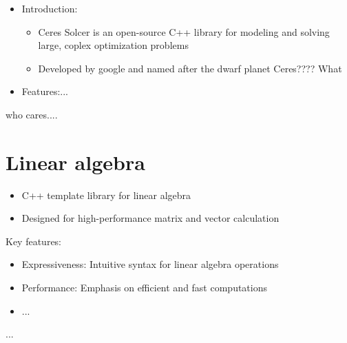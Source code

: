 \begin{itemize}
        \item Introduction:
            \begin{itemize}
                    \item Ceres Solcer is an open-source C++ library for modeling and solving large, coplex optimization problems
                    \item Developed by google and named after the dwarf planet Ceres???? What
                    
            \end{itemize}
        \item Features:...

\end{itemize}
who cares....



\section{Linear algebra}

\dfn{}
{
    \begin{itemize}
            \item C++ template library for linear algebra
            \item Designed for high-performance matrix and vector calculation
            
    \end{itemize}
}
Key features:
\begin{itemize}
        \item Expressiveness: Intuitive syntax for linear algebra operations
        \item Performance: Emphasis on efficient and fast computations
        \item ...
        
\end{itemize}

...









